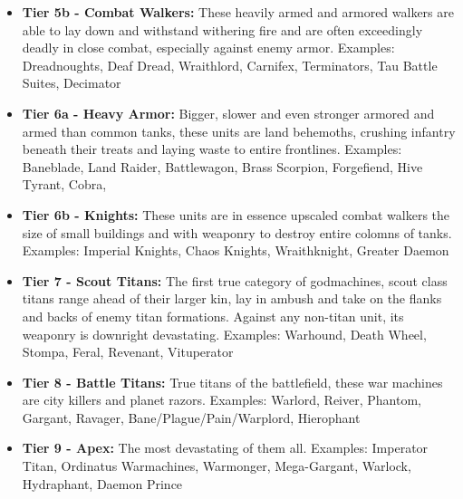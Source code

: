 \begin{itemize}
	\item \textbf{Tier 5b - Combat Walkers:} These heavily armed and armored walkers are able to lay down and withstand withering fire and are often exceedingly deadly in close combat, especially against enemy armor. Examples: Dreadnoughts, Deaf Dread, Wraithlord, Carnifex, Terminators, Tau Battle Suites, Decimator
	\item \textbf{Tier 6a - Heavy Armor:} Bigger, slower and even stronger armored and armed than common tanks, these units are land behemoths, crushing infantry beneath their treats and laying waste to entire frontlines. Examples: Baneblade, Land Raider, Battlewagon, Brass Scorpion, Forgefiend, Hive Tyrant, Cobra,
	\item \textbf{Tier 6b - Knights:} These units are in essence upscaled combat walkers the size of small buildings and with weaponry to destroy entire colomns of tanks. Examples: Imperial Knights, Chaos Knights, Wraithknight, Greater Daemon
	\item \textbf{Tier 7 - Scout Titans:} The first true category of godmachines, scout class titans range ahead of their larger kin, lay in ambush and take on the flanks and backs of enemy titan formations. Against any non-titan unit, its weaponry is downright devastating. Examples: Warhound, Death Wheel, Stompa, Feral, Revenant, Vituperator
	\item \textbf{Tier 8 - Battle Titans:} True titans of the battlefield, these war machines are city killers and planet razors. Examples: Warlord, Reiver, Phantom, Gargant, Ravager, Bane/Plague/Pain/Warplord, Hierophant
	\item \textbf{Tier 9 - Apex:} The most devastating of them all. Examples: Imperator Titan, Ordinatus Warmachines, Warmonger, Mega-Gargant, Warlock, Hydraphant, Daemon Prince
\end{itemize}

